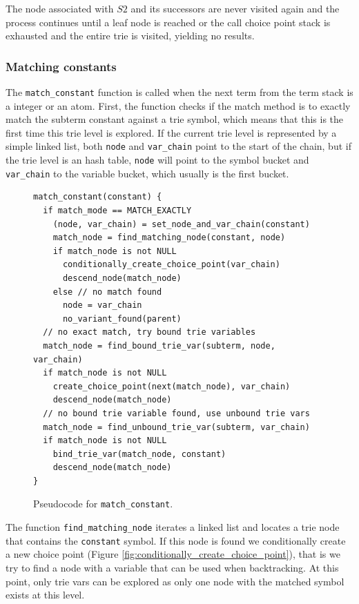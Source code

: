 The node associated with $S2$ and its successors are never visited again and
the process continues until a leaf node is reached or the call choice point stack
is exhausted and the entire trie is visited, yielding no results.

\subsubsection{Matching constants}

The \texttt{match\_constant} function is called when the next term from the term stack is a integer or an
atom. First, the function checks if the match method is to exactly match the subterm constant against a trie symbol, which means
that this is the first time this trie level is explored. If the current trie level is represented by a simple
linked list, both \texttt{node} and \texttt{var\_chain} point to the start of the chain, but if the trie level
is an hash table, \texttt{node} will point to the symbol bucket and \texttt{var\_chain} to the variable
bucket, which usually is the first bucket.

\begin{figure}[h]
\begin{verbatim}
match_constant(constant) {
  if match_mode == MATCH_EXACTLY
    (node, var_chain) = set_node_and_var_chain(constant)
    match_node = find_matching_node(constant, node)
    if match_node is not NULL
      conditionally_create_choice_point(var_chain)
      descend_node(match_node)
    else // no match found
      node = var_chain
      no_variant_found(parent)
  // no exact match, try bound trie variables
  match_node = find_bound_trie_var(subterm, node, var_chain)
  if match_node is not NULL
    create_choice_point(next(match_node), var_chain)
    descend_node(match_node)
  // no bound trie variable found, use unbound trie vars
  match_node = find_unbound_trie_var(subterm, var_chain)
  if match_node is not NULL
    bind_trie_var(match_node, constant)
    descend_node(match_node)
}
\end{verbatim}
\caption{Pseudo\-code for \texttt{match\_constant}.}
\label{fig:match_constant}
\end{figure}

The function \texttt{find\_matching\_node} iterates a linked list and locates a trie node that contains the
\texttt{constant} symbol. If this node is found we conditionally create a
new choice point (Figure \ref{fig:conditionally_create_choice_point}), that is
we try to find a node with a variable that can be used when backtracking. At this point, only
trie vars can be explored as only one node with the matched symbol exists at this level.

